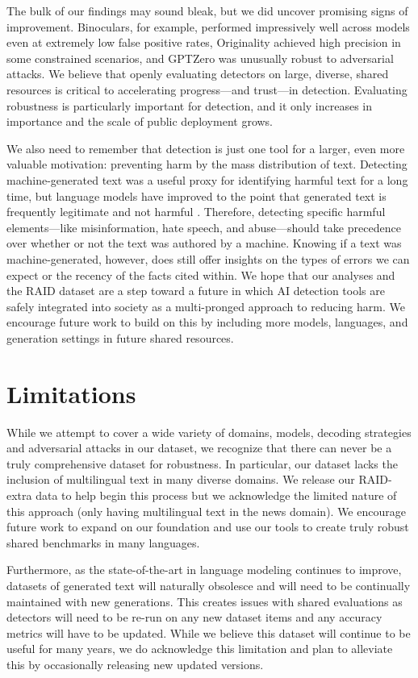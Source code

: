 \documentclass[11pt]{article}
\begin{document}
The bulk of our findings may sound bleak, but we did uncover promising signs of improvement. Binoculars, for example, performed impressively well across models even at extremely low false positive rates, Originality achieved high precision in some constrained scenarios, and GPTZero was unusually robust to adversarial attacks. We believe that openly evaluating detectors on large, diverse, shared resources is critical to accelerating progress---and trust---in detection. Evaluating robustness is particularly important for detection, and it only increases in importance and the scale of public deployment grows. 

We also need to remember that detection is just one tool for a larger, even more valuable motivation: preventing harm by the mass distribution of text. Detecting machine-generated text was a useful proxy for identifying harmful text for a long time, but language models have improved to the point that generated text is frequently legitimate and not harmful \citep{schuster-etal-2020-limitations}. Therefore, detecting specific harmful elements---like misinformation, hate speech, and abuse---should take precedence over whether or not the text was authored by a machine. Knowing if a text was machine-generated, however, does still offer insights on the types of errors we can expect or the recency of the facts cited within. We hope that our analyses and the RAID dataset are a step toward a future in which AI detection tools are safely integrated into society as a multi-pronged approach to reducing harm. We encourage future work to build on this by including more models, languages, and generation settings in future shared resources.

\section*{Limitations}
While we attempt to cover a wide variety of domains, models, decoding strategies and adversarial attacks in our dataset, we recognize that there can never be a truly comprehensive dataset for robustness. In particular, our dataset lacks the inclusion of multilingual text in many diverse domains. We release our RAID-extra data to help begin this process but we acknowledge the limited nature of this approach (only having multilingual text in the news domain). We encourage future work to expand on our foundation and use our tools to create truly robust shared benchmarks in many languages.

Furthermore, as the state-of-the-art in language modeling continues to improve, datasets of generated text will naturally obsolesce and will need to be continually maintained with new generations. This creates issues with shared evaluations as detectors will need to be re-run on any new dataset items and any accuracy metrics will have to be updated. While we believe this dataset will continue to be useful for many years, we do acknowledge this limitation and plan to alleviate this by occasionally releasing new updated versions.
\end{document}
